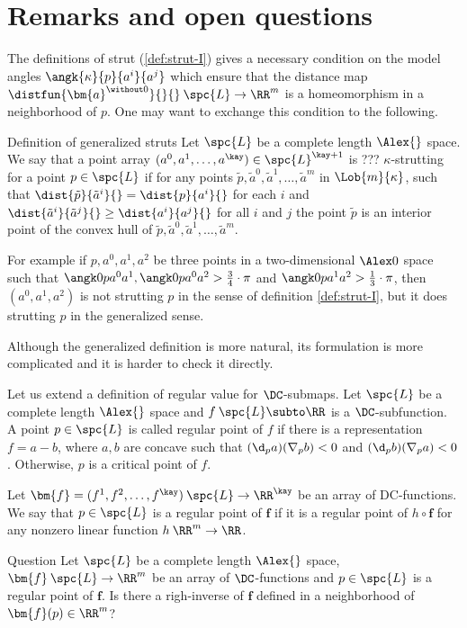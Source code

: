 \section{Remarks and open questions}

The definitions of strut (\ref{def:strut-I})
gives a necessary condition on the model angles
$\angk{\kappa}{p}{a^i}{a^j}$ which ensure that the distance 
map $\distfun{\bm{a}^{\without 0}}{}{}\:\spc{L}\to\RR^m$ 
is a homeomorphism in a neighborhood of $p$.
One may want to exchange this condition to the following.

\begin{thm}{Definition of generalized struts}\label{def:strut-generalized}
Let $\spc{L}$ be a complete length $\Alex{}$ space.
We say that a point array $(a^0,a^1,\dots,a^\kay)\in\spc{L}^{\kay+1}$
is ??? $\kappa$-strutting for a point $p\in\spc{L}$ 
if for any points $\tilde p, \tilde a^0, \tilde a^1,\dots,\tilde a^m$ in $\Lob{m}{\kappa}$, 
such that 
$\dist{\tilde p}{\tilde a^i}{}=\dist{p}{a^i}{}$ for each $i$
and $\dist{\tilde a^i}{\tilde a^j}{}\ge \dist{a^i}{a^j}{}$ for all $i$ and $j$
the point $\tilde p$ is an interior point of the convex hull of $\tilde p, \tilde a^0, \tilde a^1,\dots,\tilde a^m$.
\end{thm} 

For example if $p,a^0,a^1,a^2$ be three points in a two-dimensional $\Alex0$ space
such that $\angk0p{a^0}{a^1},\angk0p{a^0}{a^2}>\tfrac34\cdot\pi$ 
and $\angk0p{a^1}{a^2}>\tfrac13\cdot\pi$, then $(a^0,a^1,a^2)$ is not strutting $p$ in the sense of definition \ref{def:strut-I}, but it does strutting $p$ in the generalized sense.

Although the generalized definition is more natural,
its formulation is more complicated 
and it is harder to check it directly.


Let us extend a definition of regular value for $\DC$-submaps.
Let $\spc{L}$ be a complete length $\Alex{}$ space 
and $f\: \spc{L}\subto\RR$ is a $\DC$-subfunction.
A point  $p\in \spc{L}$ is called regular point of $f$ if there is a representation $f=a-b$, where $a,b$ are concave such that 
$(\d_p a)(\nabla_p b)<0$ and $(\d_p b)(\nabla_pa)<0$.
Otherwise, $p$ is a critical point of $f$.

Let ${\bm{f}}=(f^1,f^2,\dots,f^\kay)\:\spc{L}\to\RR^\kay$ be an array of  DC-functions. 
We say that $p\in \spc{L}$ is a regular point of ${\bm{f}}$ if it is a regular point of $h\circ \bm{f}$ for any nonzero linear function $h\:\RR^m\to\RR$.

\begin{thm}{Question}\label{q:regular}
Let $\spc{L}$ be a complete length $\Alex{}$ space, 
${\bm{f}}\:\spc{L}\to\RR^m$ be an array of $\DC$-functions and $p\in \spc{L}$ is a regular point of $\bm{f}$.
Is there a righ-inverse of $\bm{f}$ defined in a neighborhood of $\bm{f}(p)\in \RR^m$?
\end{thm}


